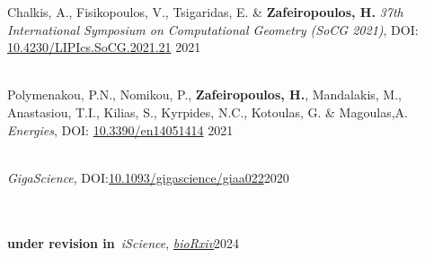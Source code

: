 \documentclass[
    a4paper,
]{fortysecondscv}
\begin{document}
\newpage
\makemoresidebar


\begin{cvtable}


    {Chalkis, A., Fisikopoulos, V., Tsigaridas, E. \& \textbf{Zafeiropoulos, H.}}
    {\textit{37th International Symposium on Computational Geometry (SoCG 2021)}, 
    DOI: \href{https://doi.org/10.4230/LIPIcs.SoCG.2021.21}{10.4230/LIPIcs.SoCG.2021.21}}
    {2021}

    \\

    {Polymenakou, P.N., Nomikou, P., \textbf{Zafeiropoulos, H.}, Mandalakis, M., Anastasiou, T.I., Kilias, S., Kyrpides, N.C., Kotoulas, G. \& Magoulas,A.}
    {\textit{Energies}, 
    DOI: \href{https://doi.org/10.3390/en14051414}{10.3390/en14051414}
    }{2021}

    \\

    {\textit{GigaScience}, 
    DOI:\href{https://doi.org/10.1093/gigascience/giaa022}{10.1093/gigascience/giaa022}}{2020}

    \\
    \hline \\

    {\textbf{under revision in}~\textit{iScience}, \href{https://doi.org/10.1101/2023.07.10.548314}{\textit{bioRxiv}}}{2024}

    \\
    

\end{cvtable}
\end{document}
